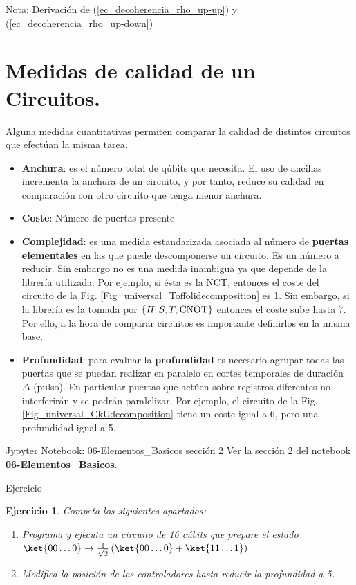 \documentclass[a4paper,11pt]{book} %
\newtheorem{ejercicio_contador}{Ejercicio}
\newcommand{\Ejercicio}[1]{
		\begin{mybox_gray}{Ejercicio} 
			\begin{ejercicio_contador}
				 #1 
			\end{ejercicio_contador} 
		\end{mybox_gray}
	}
\numberwithin{equation}{chapter}
\begin{document}
\begin{mybox_blue}{Nota: Derivación de (\ref{ec_decoherencia_rho_up-up}) y  (\ref{ec_decoherencia_rho_up-down})}
    \section{Medidas de calidad de un Circuitos.}

Alguna medidas cuantitativas  permiten comparar la calidad de distintos circuitos que efectúan la misma tarea. 
\begin{itemize}
	\item \textbf{Anchura}: es el número total de qúbits  que necesita. El uso de ancillas incrementa la anchura de un circuito, y por tanto, reduce su calidad en comparación con otro circuito que tenga menor anchura. 
	
	\item \textbf{Coste}: Número de puertas presente
	
	\item \textbf{Complejidad}: es una medida estandarizada asociada al número de \textbf{puertas elementales} en las que puede descomponerse un circuito.  Es un número a reducir. Sin embargo no es una medida inambigua ya que depende de la librería utilizada. Por ejemplo, si ésta es la NCT, entonces el coste del circuito de la Fig. \ref{Fig_universal_Toffolidecomposition} es 1. Sin embargo, si la librería es la tomada por $ \{ H, S, T, \hbox{CNOT}\}$ entonces el coste sube hasta 7. Por ello, a la hora de comparar circuitos es importante definirlos en la misma base. 
	
	\item \textbf{Profundidad}: para evaluar la \textbf{profundidad} es necesario agrupar todas las puertas que se puedan realizar en paralelo en cortes temporales de duración $\Delta$ (pulso). En particular puertas que actúen sobre registros diferentes no interferirán y se podrán paralelizar. Por ejemplo, el circuito de la Fig. \ref{Fig_universal_CkUdecomposition} tiene un coste igual a 6, pero una profundidad igual a 5. 
\end{itemize}

	\begin{mybox_orange}{Jypyter Notebook: 06-Elementos\_Basicos sección 2}
	Ver la sección 2 del notebook \textbf{06-Elementos\_Basicos}.
	\end{mybox_orange}
	
	\Ejercicio{
		Competa los siguientes apartados:	
		\begin{enumerate} 
		\item Programa y ejecuta un circuito de 16 cúbits que prepare el estado $\ket{00\ldots 0} \to \frac{1}{\sqrt{2}}\left(\ket{00\ldots 0} + \ket{11\ldots 1}\right) $ 
		\item Modifica la posición de los controladores hasta reducir la profundidad a 5.
	\end{enumerate}
	}


\end{mybox_blue}
\end{document}
